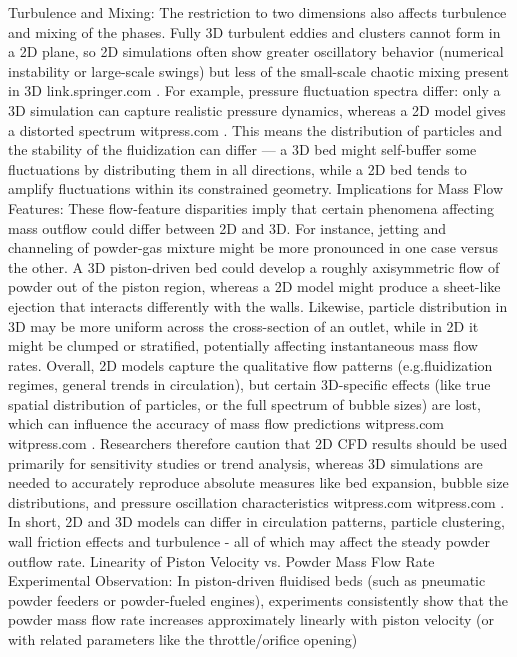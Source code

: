 Turbulence and Mixing: The restriction to two dimensions also affects turbulence and mixing of the phases. Fully 3D turbulent eddies and clusters cannot form in a 2D plane, so 2D simulations often show greater oscillatory behavior (numerical instability or large-scale swings) but less of the small-scale chaotic mixing present in 3D
link.springer.com
. For example, pressure fluctuation spectra differ: only a 3D simulation can capture realistic pressure dynamics, whereas a 2D model gives a distorted spectrum
witpress.com
. This means the distribution of particles and the stability of the fluidization can differ — a 3D bed might self-buffer some fluctuations by distributing them in all directions, while a 2D bed tends to amplify fluctuations within its constrained geometry.
Implications for Mass Flow Features: These flow-feature disparities imply that certain phenomena affecting mass outflow could differ between 2D and 3D. For instance, jetting and channeling of powder-gas mixture might be more pronounced in one case versus the other. A 3D piston-driven bed could develop a roughly axisymmetric flow of powder out of the piston region, whereas a 2D model might produce a sheet-like ejection that interacts differently with the walls. Likewise, particle distribution in 3D may be more uniform across the cross-section of an outlet, while in 2D it might be clumped or stratified, potentially affecting instantaneous mass flow rates. Overall, 2D models capture the qualitative flow patterns (e.g.fluidization regimes, general trends in circulation), but certain 3D-specific effects (like true spatial distribution of particles, or the full spectrum of bubble sizes) are lost, which can influence the accuracy of mass flow predictions
witpress.com
witpress.com
. Researchers therefore caution that 2D CFD results should be used primarily for sensitivity studies or trend analysis, whereas 3D simulations are needed to accurately reproduce absolute measures like bed expansion, bubble size distributions, and pressure oscillation characteristics
witpress.com
witpress.com
. In short, 2D and 3D models can differ in circulation patterns, particle clustering, wall friction effects and turbulence - all of which may affect the steady powder outflow rate.
Linearity of Piston Velocity vs. Powder Mass Flow Rate
Experimental Observation: In piston-driven fluidised beds (such as pneumatic powder feeders or powder-fueled engines), experiments consistently show that the powder mass flow rate increases approximately linearly with piston velocity (or with related parameters like the throttle/orifice opening)
